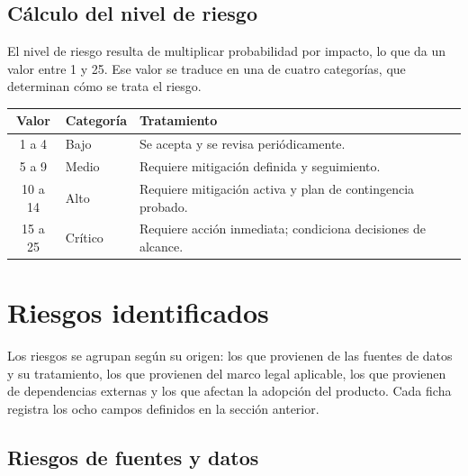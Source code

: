 \documentclass[11pt,a4paper]{article}
\begin{document}
\subsection{C\'alculo del nivel de riesgo}

El nivel de riesgo resulta de multiplicar probabilidad por impacto, lo que da un
valor entre 1 y 25. Ese valor se traduce en una de cuatro categor\'ias, que
determinan c\'omo se trata el riesgo.

\begin{tabularx}{\textwidth}{@{}c l X@{}}
\toprule
\textbf{Valor} & \textbf{Categor\'ia} & \textbf{Tratamiento} \\
\midrule
1 a 4   & Bajo     & Se acepta y se revisa peri\'odicamente. \\
5 a 9   & Medio    & Requiere mitigaci\'on definida y seguimiento. \\
10 a 14 & Alto     & Requiere mitigaci\'on activa y plan de contingencia probado. \\
15 a 25 & Cr\'itico & Requiere acci\'on inmediata; condiciona decisiones de alcance. \\
\bottomrule
\end{tabularx}

\section{Riesgos identificados}

Los riesgos se agrupan seg\'un su origen: los que provienen de las fuentes de
datos y su tratamiento, los que provienen del marco legal aplicable, los que
provienen de dependencias externas y los que afectan la adopci\'on del producto.
Cada ficha registra los ocho campos definidos en la secci\'on anterior.

\subsection*{Riesgos de fuentes y datos}
\end{document}
